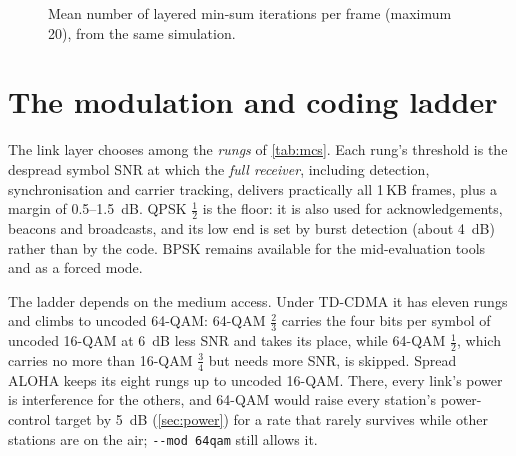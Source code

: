 \documentclass[11pt,a4paper,oneside]{report}
\newcommand{\code}[1]{\texttt{\small #1}}
\newcommand{\EsNo}{\ensuremath{E_s/N_0}}
\begin{document}
\begin{figure}[htbp]
\centering
{}
\caption{Mean number of layered min-sum iterations per frame (maximum 20), from the same simulation.}
\label{fig:iters}
\end{figure}

\section{The modulation and coding ladder}\label{sec:ladder}
The link layer chooses among the \emph{rungs} of \cref{tab:mcs}. Each rung's threshold is the despread
symbol SNR at which the \emph{full receiver}, including detection, synchronisation and carrier
tracking, delivers practically all 1\,KB frames, plus a margin of 0.5--\SI{1.5}{dB}. QPSK $\tfrac12$ is the
floor: it is also used for acknowledgements, beacons and broadcasts, and its low end is set by burst
detection (about \SI{4}{dB}) rather than by the code. BPSK remains available for the mid-evaluation
tools and as a forced mode.

The ladder depends on the medium access. Under TD-CDMA it has eleven rungs and climbs to uncoded
64-QAM: 64-QAM $\tfrac23$ carries the four bits per symbol of uncoded 16-QAM at \SI{6}{dB} less SNR and
takes its place, while 64-QAM $\tfrac12$, which carries no more than 16-QAM $\tfrac34$ but needs more SNR,
is skipped. Spread ALOHA keeps its eight rungs up to uncoded 16-QAM. There, every link's power is
interference for the others, and 64-QAM would raise every station's power-control target by \SI{5}{dB}
(\cref{sec:power}) for a rate that rarely survives while other stations are on the air;
\code{-{}-mod 64qam} still allows it.
\end{document}
